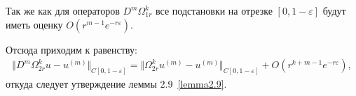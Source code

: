 Так же как для операторов $ D^m\Omega_{1r}^k $ все подстановки на отрезке $ [0,1-\varepsilon] $ будут иметь оценку $ O(r^{m-1}e^{-r\varepsilon}) $.

Отсюда приходим к равенству:
\begin{equation}
\begin{array}{c}
\nonumber

\Vert D^m\Omega_{2r}^ku - u^{(m)} \Vert_{C[0,1-\varepsilon]} = \Vert \Omega_{2r}^ku^{(m)} - u^{(m)} \Vert_{C[0,1-\varepsilon]} + O(r^{k+m-1}e^{-r\varepsilon}),

\end{array}
\end{equation}
откуда следует утверждение леммы 2.9~\eqref{lemma2.9}.


